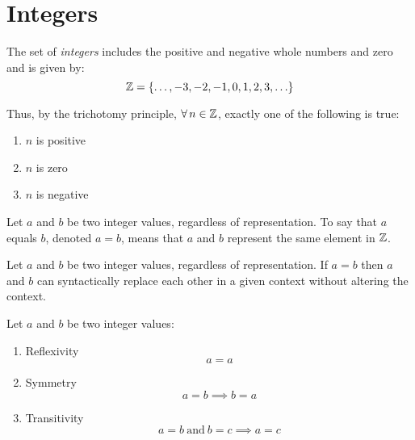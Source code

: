 \documentclass[letterpaper,12pt,fleqn]{article}
\begin{document}
\section*{Integers}

\begin{definition}
  The set of \emph{integers} includes the positive and negative whole numbers
  and zero and is given by:
  \[\mathbb{Z}=\{\ldots,-3,-2,-1,0,1,2,3,\ldots\}\]
\end{definition}

Thus, by the trichotomy principle, $\forall\,n\in\mathbb{Z}$, exactly one of the
following is true:
\begin{enumerate}
\item $n$ is positive
\item $n$ is zero
\item $n$ is negative
\end{enumerate}

\begin{definition}
  Let $a$ and $b$ be two integer values, regardless of representation. To say
  that $a$ equals $b$, denoted $a=b$, means that $a$ and $b$ represent the same
  element in $\mathbb{Z}$.
\end{definition}

\begin{axiom}
  Let $a$ and $b$ be two integer values, regardless of representation. If $a=b$
  then $a$ and $b$ can syntactically replace each other in a given context
  without altering the context.
\end{axiom}

\begin{properties}[Equality]
  Let $a$ and $b$ be two integer values:
  \begin{enumerate}
  \item Reflexivity
    \[a=a\]
    
  \item Symmetry
    \[a=b\implies b=a\]

  \item Transitivity
    \[a=b\ \mbox{and}\ b=c\implies a=c\]
  \end{enumerate}
\end{properties}
\end{document}
